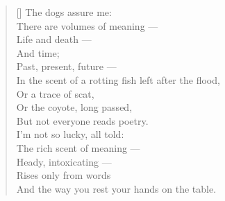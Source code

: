\begin{verse}[\textwidth]
  The dogs assure me:\\
  There are volumes of meaning ---\\
  Life and death ---\\
  And time;\\
  Past, present, future ---\\
  In the scent of a rotting fish left after the flood,\\
  Or a trace of scat,\\
  Or the coyote, long passed,\\
  But not everyone reads poetry.\\

  \vspace{1pc}
  I'm not so lucky, all told:\\
  The rich scent of meaning ---\\
  Heady, intoxicating ---\\
  Rises only from words\\
  And the way you rest your hands on the table.
\end{verse}
